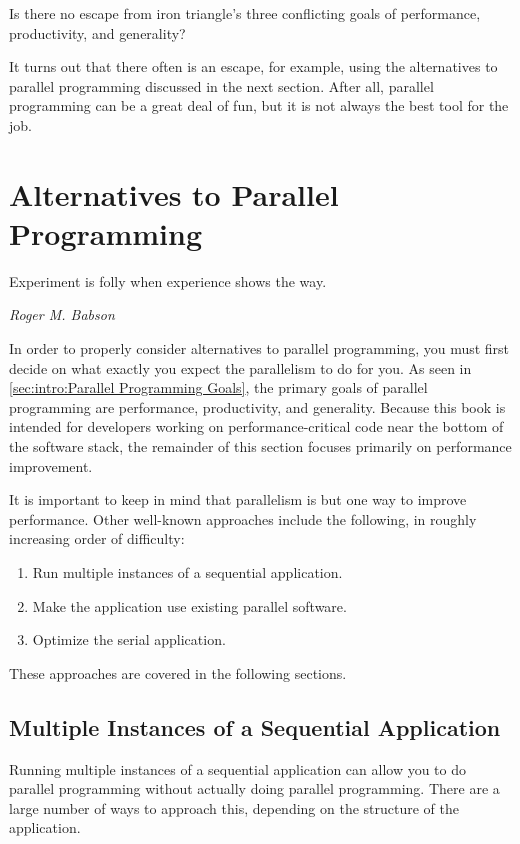 Is there no escape from iron triangle's three conflicting goals of
performance, productivity, and generality?

It turns out that there often is an escape, for example,
using the alternatives to parallel programming discussed in the next section.
After all, parallel programming can be a great deal of fun, but
it is not always the best tool for the job.

\section{Alternatives to Parallel Programming}
\label{sec:intro:Alternatives to Parallel Programming}
%
\epigraph{Experiment is folly when experience shows the way.}
	 {\emph{Roger M. Babson}}

In order to properly consider alternatives to parallel programming,
you must first decide on what exactly you expect the parallelism
to do for you.
As seen in \cref{sec:intro:Parallel Programming Goals},
the primary goals of parallel programming are performance, productivity,
and generality.
Because this book is intended for developers working on
performance-critical code near the bottom of the software stack,
the remainder of this section focuses primarily on performance improvement.

It is important to keep in mind that parallelism is but one way to
improve performance.
Other well-known approaches include the following, in roughly increasing
order of difficulty:

\begin{enumerate}
\item	Run multiple instances of a sequential application.
\item	Make the application use existing parallel software.
\item	Optimize the serial application.
\end{enumerate}

These approaches are covered in the following sections.

\subsection{Multiple Instances of a Sequential Application}
\label{sec:intro:Multiple Instances of a Sequential Application}

Running multiple instances of a sequential application can allow you
to do parallel programming without actually doing parallel programming.
There are a large number of ways to approach this, depending on the
structure of the application.

